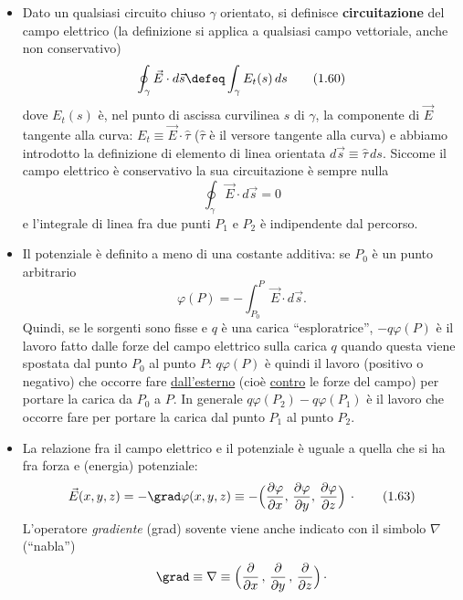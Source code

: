 \begin{itemize}
\item[i)] Dato un qualsiasi circuito chiuso $\gamma$ orientato, si definisce \textbf{circuitazione} del campo elettrico (la definizione si applica a qualsiasi campo vettoriale, anche non conservativo)
\begin{equation}
\oint_\gamma\vec E\cdot d\vec s\defeq\int_\gamma E_t(s)\,ds
\tag{1.60}
\end{equation}
dove $E_t(s)$ è, nel punto di ascissa curvilinea $s$ di $\gamma$, la componente di $\vec E$ tangente alla curva: $E_t\equiv\vec E\cdot\hat\tau$ ($\hat\tau$ è il versore tangente alla curva) e abbiamo introdotto la definizione di elemento di linea orientata $d\vec s\equiv\hat\tau\,ds$. Siccome il campo elettrico è conservativo la sua circuitazione è sempre nulla
\begin{equation}
\oint_\gamma\vec E\cdot d\vec s=0
\tag{1.61}
\end{equation}
e l'integrale di linea fra due punti $P_1$ e $P_2$ è indipendente dal percorso.
\item[ii)] Il potenziale è definito a meno di una costante additiva: se $P_0$ è un punto arbitrario
\begin{equation}
\varphi(P)=-\int_{P_0}^P\vec E\cdot d\vec s.
\tag{1.62}
\end{equation}
Quindi, se le sorgenti sono fisse e $q$ è una carica ``esploratrice'', $-q\varphi(P)$ è il lavoro fatto dalle forze del campo elettrico sulla carica $q$ quando questa viene spostata dal punto $P_0$ al punto $P$: $q\varphi(P)$ è quindi il lavoro (positivo o negativo) che occorre fare \underline{dall'esterno} (cioè \underline{contro} le forze del campo) per portare la carica da $P_0$ a $P$. In generale $q\varphi(P_2)-q\varphi(P_1)$ è il lavoro che occorre fare per portare la carica dal punto $P_1$ al punto $P_2$.
\item[iii)] La relazione fra il campo elettrico e il potenziale è uguale a quella che si ha fra forza e (energia) potenziale:
\begin{equation}
\vec E(x,y,z)=-\grad\varphi(x,y,z)\equiv-\Big(\frac{\partial\varphi}{\partial x},\,\frac{\partial\varphi}{\partial y},\,\frac{\partial\varphi}{\partial z}\Big)\,\cdot
\tag{1.63}
\end{equation}
L'operatore \emph{gradiente} (grad) sovente viene anche indicato con il simbolo $\nabla$ (``nabla'')
\begin{equation}
\grad\equiv\nabla\equiv\Big(\frac{\partial}{\partial x}\,,\,\frac{\partial}{\partial y}\,,\,\frac{\partial}{\partial z}\Big)\,\cdot

\end{equation}
\end{itemize}
